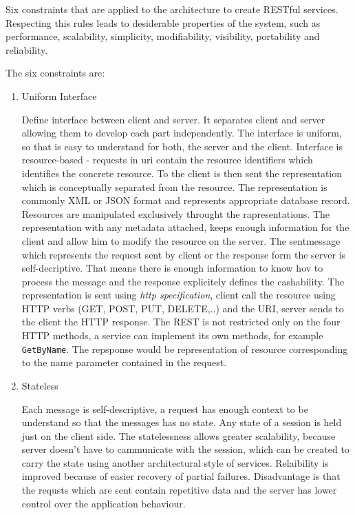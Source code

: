 Six constraints that are applied to the architecture to create RESTful services. Respecting this rules leads to desiderable properties of the system, such as performance, scalability, simplicity, modifiability, visibility, portability and reliability. 
\begin{description}
  \item The six constraints are:
  

\begin{enumerate}
  \item Uniform Interface
  
Define interface between client and server. It separates client and server allowing them to develop each part independently. The interface is uniform, so that is easy to understand for both, the server and the client.
Interface is resource-based - requests in \gls{uri} contain the resource identifiers which identifies the concrete resource. To the client is then sent the representation which is conceptually separated from the resource. The representation is commonly XML or JSON format and represents appropriate database record.
Resources are manipulated exclusively throught the rapresentations. The representation with any metadata attached, keeps enough information for the client and allow him to modify the resource on the server.
The sentmessage which represents the request sent by client or the response form the server is self-decriptive. That means there is enough information to know hov to process the message and the response explicitely defines the cashability.
The representation is sent using \emph{\gls{http} specification}, client call the resource using HTTP verbs (GET, POST, PUT, DELETE,..) and the URI, server sends to the client the HTTP response.
The REST is not restricted only on the four HTTP methods, a service can implement its own methods, for example \texttt{GetByName}. The repsponse would be representation of resource corresponding to the name parameter contained in the request.

  \item Stateless
  
Each message is self-descriptive, a request has enough context to be understand so that the messages has no state. Any state of a \gls{session} is held just on the client side.
The statelessness allows greater scalability, because server doesn't have to cammunicate with the session, which can be created to carry the state using another architectural style of services. Relaibility is improved because of easier recovery of partial failures. Disadvantage is that the requsts which are sent contain repetitive data and the server has lower control over the application behaviour.


\end{enumerate}
\end{description}
